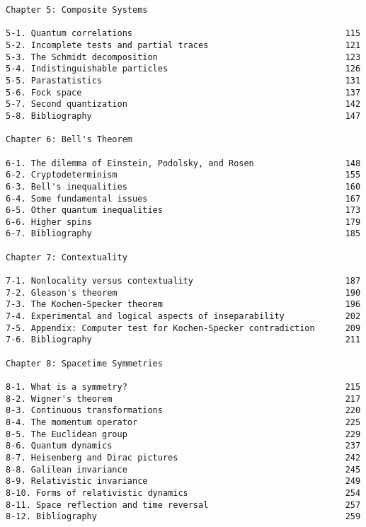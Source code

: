 \begin{verbatim}
Chapter 5: Composite Systems  
 
5-1. Quantum correlations                                          115 
5-2. Incomplete tests and partial traces                           121 
5-3. The Schmidt decomposition                                     123 
5-4. Indistinguishable particles                                   126 
5-5. Parastatistics                                                131 
5-6. Fock space                                                    137 
5-7. Second quantization                                           142 
5-8. Bibliography                                                  147
 
Chapter 6: Bell's Theorem  
 
6-1. The dilemma of Einstein, Podolsky, and Rosen                  148 
6-2. Cryptodeterminism                                             155 
6-3. Bell's inequalities                                           160 
6-4. Some fundamental issues                                       167 
6-5. Other quantum inequalities                                    173 
6-6. Higher spins                                                  179 
6-7. Bibliography                                                  185
      
Chapter 7: Contextuality  
 
7-1. Nonlocality versus contextuality                              187 
7-2. Gleason's theorem                                             190 
7-3. The Kochen-Specker theorem                                    196 
7-4. Experimental and logical aspects of inseparability            202 
7-5. Appendix: Computer test for Kochen-Specker contradiction      209
7-6. Bibliography                                                  211

Chapter 8: Spacetime Symmetries  
 
8-1. What is a symmetry?                                           215 
8-2. Wigner's theorem                                              217 
8-3. Continuous transformations                                    220 
8-4. The momentum operator                                         225 
8-5. The Euclidean group                                           229 
8-6. Quantum dynamics                                              237 
8-7. Heisenberg and Dirac pictures                                 242 
8-8. Galilean invariance                                           245 
8-9. Relativistic invariance                                       249 
8-10. Forms of relativistic dynamics                               254 
8-11. Space reflection and time reversal                           257 
8-12. Bibliography                                                 259
     

\end{verbatim}
